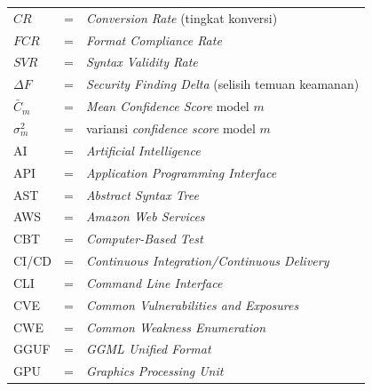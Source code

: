 \begin{center}

\begin{tabular}{llp{3in}}
	$CR$ & \hspace{1.5cm} = & \textit{Conversion Rate} (tingkat konversi) \\
	$FCR$ & \hspace{1.5cm} = & \textit{Format Compliance Rate} \\
	$SVR$ & \hspace{1.5cm} = & \textit{Syntax Validity Rate} \\
	$\Delta F$ & \hspace{1.5cm} = & \textit{Security Finding Delta} (selisih temuan keamanan) \\
	$\bar{C}_m$ & \hspace{1.5cm} = & \textit{Mean Confidence Score} model $m$ \\
	$\sigma^2_m$ & \hspace{1.5cm} = & variansi \textit{confidence score} model $m$ \\
	AI & \hspace{1.5cm} = & \textit{Artificial Intelligence} \\
	API & \hspace{1.5cm} = & \textit{Application Programming Interface} \\
	AST & \hspace{1.5cm} = & \textit{Abstract Syntax Tree} \\
	AWS & \hspace{1.5cm} = & \textit{Amazon Web Services} \\
	CBT & \hspace{1.5cm} = & \textit{Computer-Based Test} \\
	CI/CD & \hspace{1.5cm} = & \textit{Continuous Integration/Continuous Delivery} \\
	CLI & \hspace{1.5cm} = & \textit{Command Line Interface} \\
	CVE & \hspace{1.5cm} = & \textit{Common Vulnerabilities and Exposures} \\
	CWE & \hspace{1.5cm} = & \textit{Common Weakness Enumeration} \\
	GGUF & \hspace{1.5cm} = & \textit{GGML Unified Format} \\
	GPU & \hspace{1.5cm} = & \textit{Graphics Processing Unit} \\

\end{tabular}
\end{center}
